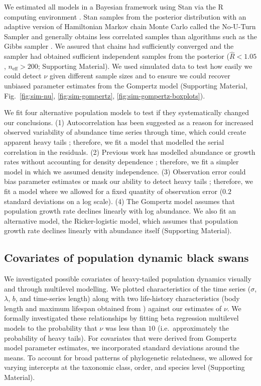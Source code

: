 We estimated all models in a Bayesian framework using Stan \citep[][version
2.4.0]{stan-manual2014} via the R computing environment \citep{r2014}. Stan
samples from the posterior distribution with an adaptive version of Hamiltonian
Markov chain Monte Carlo called the No-U-Turn Sampler and generally obtains
less correlated samples than algorithms such as the Gibbs sampler
\citep{hoffman2014}. We assured that chains had sufficiently converged and the
sampler had obtained sufficient independent samples from the posterior
($\widehat{R} < 1.05$, $n_\mathrm{eff} > 200$; Supporting Material). We used
simulated data to test how easily we could detect $\nu$ given different sample
sizes and to ensure we could recover unbiased parameter estimates from the
Gompertz model (Supporting Material, Fig.~\ref{fig:sim-nu},
\ref{fig:sim-gompertz}, \ref{fig:sim-gompertz-boxplots}).

We fit four alternative population models to test if they systematically
changed our conclusions. (1) Autocorrelation has been suggested as a reason for
increased observed variability of abundance time series through time, which
could create apparent heavy tails \citep{inchausti2002}; therefore, we fit
a model that modelled the serial correlation in the residuals. (2) Previous
work has modelled abundance or growth rates without accounting for density
dependence \citep{halley2002,segura2013}; therefore, we fit a simpler model in
which we assumed density independence. (3) Observation error could bias
parameter estimates \citep{knape2012} or mask our ability to detect heavy tails
\citep{ward2007}; therefore, we fit a model where we allowed for a fixed
quantity of observation error ($0.2$ standard deviations on a log scale). (4)
The Gompertz model assumes that population growth rate declines linearly with
log abundance. We also fit an alternative model, the Ricker-logistic model,
which assumes that population growth rate declines linearly with abundance
itself (Supporting Material).

\subsection{Covariates of population dynamic black swans}

We investigated possible covariates of heavy-tailed population dynamics
visually and through multilevel modelling. We plotted characteristics of the
time series ($\sigma$, $\lambda$, $b$, and time-series length) along with two
life-history characteristics (body length and maximum lifespan obtained from
\citet{brook2006a}) against our estimates of $\nu$. We formally investigated
these relationships by fitting beta regression multilevel models to the
probability that $\nu$ was less than $10$ (i.e.~approximately the probability
of heavy tails). For covariates that were derived from Gompertz model parameter
estimates, we incorporated standard deviations around the means. To account for
broad patterns of phylogenetic relatedness, we allowed for varying intercepts
at the taxonomic class, order, and species level (Supporting Material).

